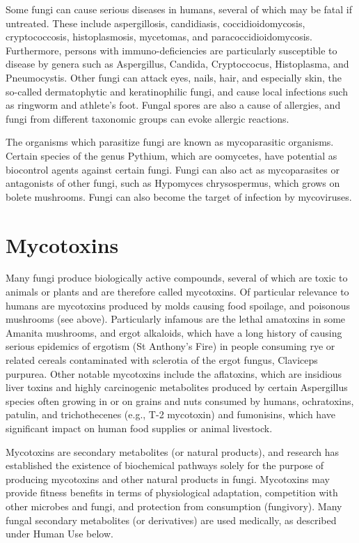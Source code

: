 Some fungi can cause serious diseases in humans, several of which may be fatal if untreated. These include aspergillosis, candidiasis, coccidioidomycosis, cryptococcosis, histoplasmosis, mycetomas, and paracoccidioidomycosis. Furthermore, persons with immuno-deficiencies are particularly susceptible to disease by genera such as Aspergillus, Candida, Cryptoccocus, Histoplasma, and Pneumocystis. Other fungi can attack eyes, nails, hair, and especially skin, the so-called dermatophytic and keratinophilic fungi, and cause local infections such as ringworm and athlete's foot. Fungal spores are also a cause of allergies, and fungi from different taxonomic groups can evoke allergic reactions.

The organisms which parasitize fungi are known as mycoparasitic organisms. Certain species of the genus Pythium, which are oomycetes, have potential as biocontrol agents against certain fungi. Fungi can also act as mycoparasites or antagonists of other fungi, such as Hypomyces chrysospermus, which grows on bolete mushrooms. Fungi can also become the target of infection by mycoviruses.

\hypertarget{mycotoxins}{%
\section{Mycotoxins}\label{mycotoxins}}

Many fungi produce biologically active compounds, several of which are toxic to animals or plants and are therefore called mycotoxins. Of particular relevance to humans are mycotoxins produced by molds causing food spoilage, and poisonous mushrooms (see above). Particularly infamous are the lethal amatoxins in some Amanita mushrooms, and ergot alkaloids, which have a long history of causing serious epidemics of ergotism (St Anthony's Fire) in people consuming rye or related cereals contaminated with sclerotia of the ergot fungus, Claviceps purpurea. Other notable mycotoxins include the aflatoxins, which are insidious liver toxins and highly carcinogenic metabolites produced by certain Aspergillus species often growing in or on grains and nuts consumed by humans, ochratoxins, patulin, and trichothecenes (e.g., T-2 mycotoxin) and fumonisins, which have significant impact on human food supplies or animal livestock.

Mycotoxins are secondary metabolites (or natural products), and research has established the existence of biochemical pathways solely for the purpose of producing mycotoxins and other natural products in fungi. Mycotoxins may provide fitness benefits in terms of physiological adaptation, competition with other microbes and fungi, and protection from consumption (fungivory). Many fungal secondary metabolites (or derivatives) are used medically, as described under Human Use below.

